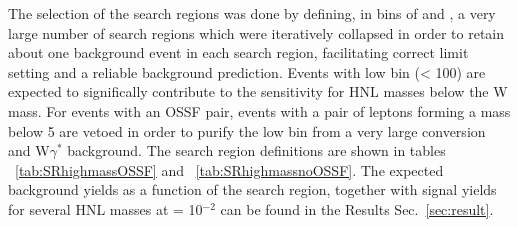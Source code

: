 The selection of the search regions was done by defining, in bins of
\mtmin and \mmin, a very large number of search regions which were
iteratively collapsed in order to retain about one background event in
each search region, facilitating correct limit setting and a reliable
background prediction. Events with low
\mlll bin (\mlll < 100\GeV) are expected to significally contribute to
the sensitivity for HNL masses below the W mass. For events with an
OSSF pair, events with a pair of \lo leptons forming a mass below 5
\GeV are vetoed in order to purify the low \mlll bin from a very large
conversion and W$\gamma^{*}$ background. The search region definitions
are shown in tables ~\ref{tab:SRhighmassOSSF} and
~\ref{tab:SRhighmassnoOSSF}. The expected background yields as a
function of the search region, together with signal yields for several
HNL masses at \mixpar = 10$^{-2}$ can be found in the Results
Sec.~\ref{sec:result}.



\begin{table}[h!]
\centering
{\scriptsize
\caption{Search regions for events with an OSSF pair in the high mass category.}
\label{tab:SRhighmassOSSF}
}
\end{table}

